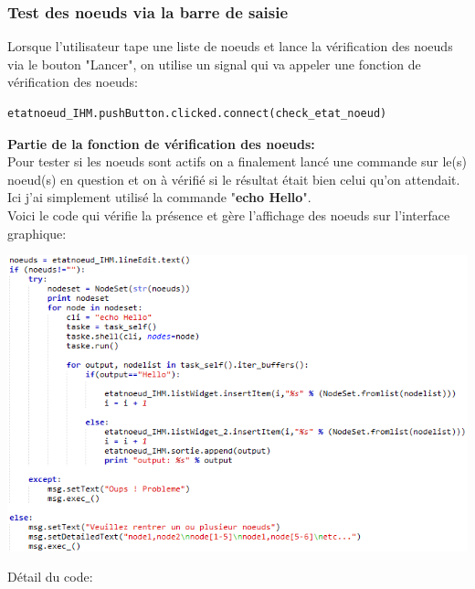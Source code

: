 \documentclass[a4paper,11pt]{article}
\begin{document}
\subsubsection{Test des noeuds via la barre de saisie}
Lorsque l'utilisateur tape une liste de noeuds et lance la vérification des noeuds via le bouton "Lancer", on utilise un signal qui va appeler une fonction de vérification des noeuds:\\
\begin{lstlisting}
etatnoeud_IHM.pushButton.clicked.connect(check_etat_noeud)
\end{lstlisting}
\textbf{Partie de la fonction de vérification des noeuds:}\\
Pour tester si les noeuds sont actifs on a finalement lancé une commande sur le(s) noeud(s) en question et on à vérifié si le résultat était bien celui qu'on attendait. Ici j'ai simplement utilisé la commande "\textbf{echo Hello}".\\
Voici le code qui vérifie la présence et gère l'affichage des noeuds sur l'interface graphique:
\begin{flushleft}
\includegraphics[scale=1]{check_etatnoeud.png} 
\end{flushleft}
Détail du code:\\
\end{document}
